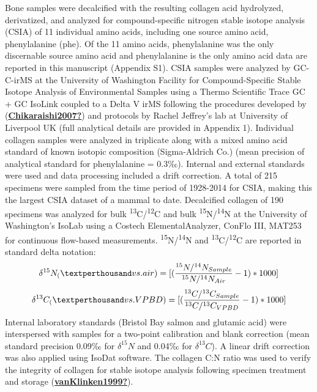 \documentclass [11pt, proquest] {uwthesis}[2015/03/03]
\begin{document}
Bone samples were decalcified with the resulting collagen acid hydrolyzed, derivatized, and analyzed for compound-specific nitrogen stable isotope analysis (CSIA) of 11 individual amino acids, including one source amino acid, phenylalanine (phe). Of the 11 amino acids, phenylalanine was the only discernable source amino acid and phenylalanine is the only amino acid data are reported in this manuscript (Appendix S1). CSIA samples were analyzed by GC-C-irMS at the University of Washington Facility for Compound-Specific Stable Isotope Analysis of Environmental Samples using a Thermo Scientific Trace GC + GC IsoLink coupled to a Delta V irMS following the procedures developed by (\protect\hyperlink{ref-Chikaraishi2007}{\textbf{Chikaraishi2007?}}) and protocols by Rachel Jeffrey's lab at University of Liverpool UK (full analytical details are provided in Appendix 1). Individual collagen samples were analyzed in triplicate along with a mixed amino acid standard of known isotopic composition (Sigma-Aldrich Co.) (mean precision of analytical standard for phenylalanine = 0.3‰). Internal and external standards were used and data processing included a drift correction. A total of 215 specimens were sampled from the time period of 1928-2014 for CSIA, making this the largest CSIA dataset of a mammal to date. Decalcified collagen of 190 specimens was analyzed for bulk \textsuperscript{13}C/\textsuperscript{12}C and bulk \textsuperscript{15}N/\textsuperscript{14}N at the University of Washington's IsoLab using a Costech ElementalAnalyzer, ConFlo III, MAT253 for continuous flow-based measurements. \textsuperscript{15}N/\textsuperscript{14}N and \textsuperscript{13}C/\textsuperscript{12}C are reported in standard delta notation:
\begin{equation} 
  \delta^{15}N_ ( \textperthousand vs. air) =   
  [(\frac{^{15}N/^{14}N_{Sample}}{^{15}N/^{14}N_{Air}} -1)*1000]
  \label{eq:deltN}
\end{equation}
\begin{equation} 
  \delta^{13}C_ ( \textperthousand vs. VPBD) =   
  [(\frac{^{13}C/^{13}C_{Sample}}{^{13}C/^{13}C_{VPBD}} -1)*1000]
  \label{eq:deltC}
\end{equation}
Internal laboratory standards (Bristol Bay salmon and glutamic acid) were interspersed with samples for a two-point calibration and blank correction (mean standard precision 0.09‰ for \(\delta^{15}N\) and 0.04‰ for \(\delta^{13}C\)). A linear drift correction was also applied using IsoDat software. The collagen C:N ratio was used to verify the integrity of collagen for stable isotope analysis following specimen treatment and storage (\protect\hyperlink{ref-vanKlinken1999}{\textbf{vanKlinken1999?}}).
\end{document}
